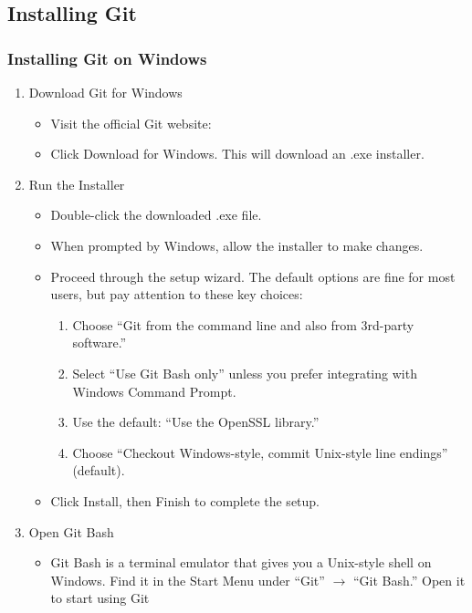 \subsection*{Installing Git}
\subsubsection{Installing Git on Windows}
\begin{enumerate}
\item Download Git for Windows
	\begin{itemize}
		\item Visit the official Git website: 
		\item Click Download for Windows. This will download an .exe installer.
	\end{itemize}
\item Run the Installer
	\begin{itemize}
		\item Double-click the downloaded .exe file.
		\item When prompted by Windows, allow the installer to make changes.
		\item Proceed through the setup wizard. The default options are fine for most users, but pay attention to these key choices:
		\begin{enumerate}
			\item Choose ``Git from the command line and also from 3rd-party software.''
			\item Select ``Use Git Bash only” unless you prefer integrating with Windows Command Prompt.
			\item Use the default: “Use the OpenSSL library.''
			\item Choose ``Checkout Windows-style, commit Unix-style line endings'' (default).
		\end{enumerate}
		\item Click Install, then Finish to complete the setup.
	\end{itemize}
\item Open Git Bash
	\begin{itemize}
	\item Git Bash is a terminal emulator that gives you a Unix-style shell on Windows. Find it in the Start Menu under ``Git'' $\rightarrow$ ``Git Bash.'' Open it to start using Git
	\end{itemize}
\end{enumerate}

